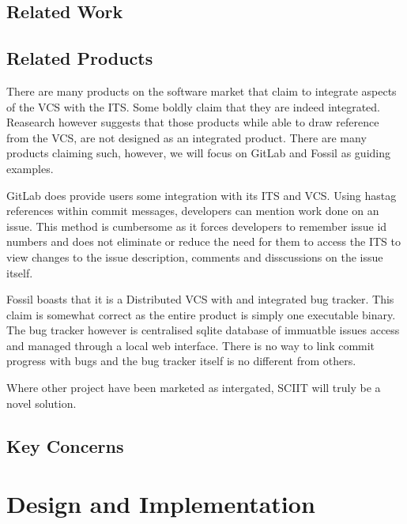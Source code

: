 \documentclass{mproj}
\begin{document}


\section{Related Work}  %

%

\section{Related Products}

There are many products on the software market that claim to integrate aspects of the VCS with the ITS. Some boldly claim that they are indeed integrated. Reasearch however suggests that those products while able to draw reference from the VCS, are not designed as an integrated product. There are many products claiming such, however, we will focus on GitLab and Fossil as guiding examples.

GitLab does provide users some integration with its ITS and VCS. Using hastag references within commit messages, developers can mention work done on an issue. This method is cumbersome as it forces developers to remember issue id numbers and does not eliminate or reduce the need for them to access the ITS to view changes to the issue description, comments and disscussions on the issue itself.

Fossil boasts that it is a Distributed VCS with and integrated bug tracker. This claim is somewhat correct as the entire product is simply one executable binary. The bug tracker however is centralised sqlite database of immuatble issues access and managed through a local web interface. There is no way to link commit progress with bugs and the bug tracker itself is no different from others.

Where other project have been marketed as intergated, SCIIT will truly be a novel solution. 

\section{Key Concerns}
\chapter{Design and Implementation}\label{design}
\end{document}
